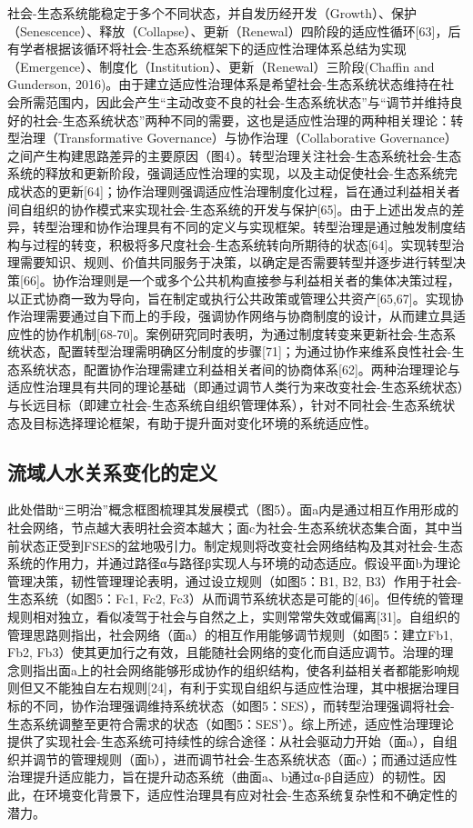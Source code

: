 社会-生态系统能稳定于多个不同状态，并自发历经开发（Growth）、保护（Senescence）、释放（Collapse）、更新（Renewal）四阶段的适应性循环[63]，后有学者根据该循环将社会-生态系统框架下的适应性治理体系总结为实现（Emergence）、制度化（Institution）、更新（Renewal）三阶段(Chaffin and Gunderson, 2016)。由于建立适应性治理体系是希望社会-生态系统状态维持在社会所需范围内，因此会产生“主动改变不良的社会-生态系统状态”与“调节并维持良好的社会-生态系统状态”两种不同的需要，这也是适应性治理的两种相关理论：转型治理（Transformative Governance）与协作治理（Collaborative Governance）之间产生构建思路差异的主要原因（图4）。转型治理关注社会-生态系统社会-生态系统的释放和更新阶段，强调适应性治理的实现，以及主动促使社会-生态系统完成状态的更新[64]；协作治理则强调适应性治理制度化过程，旨在通过利益相关者间自组织的协作模式来实现社会-生态系统的开发与保护[65]。由于上述出发点的差异，转型治理和协作治理具有不同的定义与实现框架。转型治理是通过触发制度结构与过程的转变，积极将多尺度社会-生态系统转向所期待的状态[64]。实现转型治理需要知识、规则、价值共同服务于决策，以确定是否需要转型并逐步进行转型决策[66]。协作治理则是一个或多个公共机构直接参与利益相关者的集体决策过程，以正式协商一致为导向，旨在制定或执行公共政策或管理公共资产[65,67]。实现协作治理需要通过自下而上的手段，强调协作网络与协商制度的设计，从而建立具适应性的协作机制[68-70]。案例研究同时表明，为通过制度转变来更新社会-生态系统状态，配置转型治理需明确区分制度的步骤[71]；为通过协作来维系良性社会-生态系统状态，配置协作治理需建立利益相关者间的协商体系[62]。两种治理理论与适应性治理具有共同的理论基础（即通过调节人类行为来改变社会-生态系统状态）与长远目标（即建立社会-生态系统自组织管理体系），针对不同社会-生态系统状态及目标选择理论框架，有助于提升面对变化环境的系统适应性。

\subsection{流域人水关系变化的定义}
此处借助“三明治”概念框图梳理其发展模式（图5）。面a内是通过相互作用形成的社会网络，节点越大表明社会资本越大；面c为社会-生态系统状态集合面，其中当前状态正受到FSES的盆地吸引力。制定规则将改变社会网络结构及其对社会-生态系统的作用力，并通过路径α与路径β实现人与环境的动态适应。假设平面b为理论管理决策，韧性管理理论表明，通过设立规则（如图5：B1, B2, B3）作用于社会-生态系统（如图5：Fc1, Fc2, Fc3）从而调节系统状态是可能的[46]。但传统的管理规则相对独立，看似凌驾于社会与自然之上，实则常常失效或偏离[31]。自组织的管理思路则指出，社会网络（面a）的相互作用能够调节规则（如图5：建立Fb1, Fb2, Fb3）使其更加行之有效，且能随社会网络的变化而自适应调节。治理的理念则指出面a上的社会网络能够形成协作的组织结构，使各利益相关者都能影响规则但又不能独自左右规则[24]，有利于实现自组织与适应性治理，其中根据治理目标的不同，协作治理强调维持系统状态（如图5：SES），而转型治理强调将社会-生态系统调整至更符合需求的状态（如图5：SES’）。综上所述，适应性治理理论提供了实现社会-生态系统可持续性的综合途径：从社会驱动力开始（面a），自组织并调节的管理规则（面b），进而调节社会-生态系统状态（面c）；而通过适应性治理提升适应能力，旨在提升动态系统（曲面a、b通过α-β自适应）的韧性。因此，在环境变化背景下，适应性治理具有应对社会-生态系统复杂性和不确定性的潜力。

